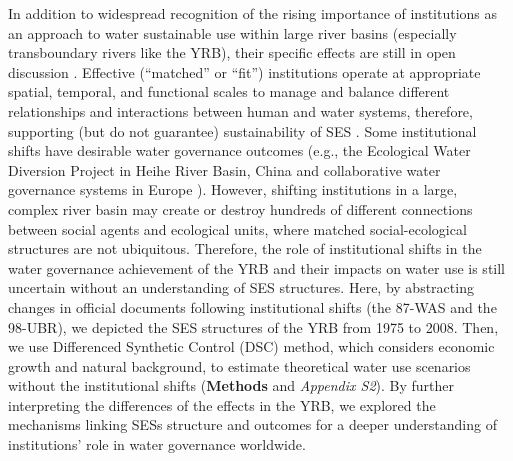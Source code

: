 In addition to widespread recognition of the rising importance of institutions as an approach to water sustainable use within large river basins (especially transboundary rivers like the YRB), their specific effects are still in open discussion \cite{agrawal2003, persha2011, agrawal2001}.
Effective (``matched'' or ``fit'') institutions operate at appropriate spatial, temporal, and functional scales to manage and balance different relationships and interactions between human and water systems, therefore, supporting (but do not guarantee) sustainability of SES \cite{epstein2015, wang2019d}.
Some institutional shifts have desirable water governance outcomes (e.g., the Ecological Water Diversion Project in Heihe River Basin, China \cite{wang2019d} and collaborative water governance systems in Europe \cite{green2013}).
However, shifting institutions in a large, complex river basin may create or destroy hundreds of different connections between social agents and ecological units, where matched social-ecological structures are not ubiquitous.
Therefore, the role of institutional shifts in the water governance achievement of the YRB and their impacts on water use is still uncertain without an understanding of SES structures.
Here, by abstracting changes in official documents following institutional shifts (the 87-WAS and the 98-UBR), we depicted the SES structures of the YRB from 1975 to 2008.
Then, we use Differenced Synthetic Control (DSC) method, which considers economic growth and natural background, to estimate theoretical water use scenarios without the institutional shifts (\textbf{Methods} and \textit{Appendix S2}).
By further interpreting the differences of the effects in the YRB, we explored the mechanisms linking SESs structure and outcomes for a deeper understanding of institutions' role in water governance worldwide.
